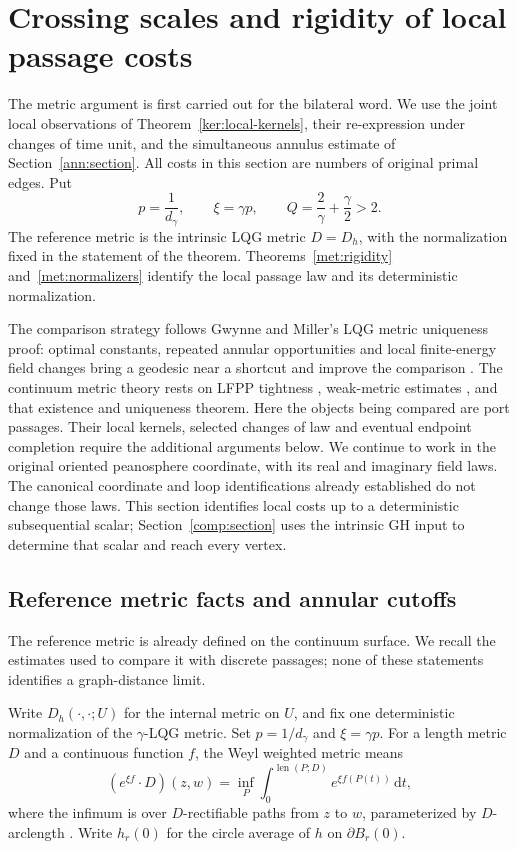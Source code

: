 \documentclass[11pt]{article}
\numberwithin{equation}{section}
\theoremstyle{definition}
\theoremstyle{remark}
\newcommand{\dd}{\mathrm d}
\newcommand{\1}{\mathbf 1}
\DeclareMathOperator{\len}{len}
\begin{document}
\section{Crossing scales and rigidity of local passage costs}
\label{met:section}

The metric argument is first carried out for the bilateral word.  We use
the joint local observations of Theorem~\ref{ker:local-kernels}, their
re-expression under changes of time unit, and the simultaneous annulus
estimate of Section~\ref{ann:section}.  All costs in this section are
numbers of original primal edges.  Put
\[
 p=\frac1{d_\gamma},\qquad \xi=\gamma p,\qquad
 Q=\frac2\gamma+\frac\gamma2>2.
\]
The reference metric is the intrinsic LQG metric $D=D_h$, with the
normalization fixed in the statement of the theorem.
Theorems~\ref{met:rigidity} and~\ref{met:normalizers} identify the local
passage law and its deterministic normalization.

The comparison strategy follows Gwynne and Miller's LQG metric uniqueness
proof: optimal constants, repeated annular opportunities and local
finite-energy field changes bring a geodesic near a shortcut and improve
the comparison
\cite[Section~1.5 and Sections~3--6]{GwynneMillerMetric}. The continuum
metric theory rests on LFPP tightness
\cite{DingDubedatDunlapFalconetTightness}, weak-metric estimates
\cite{DubedatEtAlWeakMetric}, and that existence and uniqueness theorem.
Here the objects being compared are port passages. Their local kernels,
selected changes of law and eventual endpoint completion require the
additional arguments below.  We continue to work in the original
oriented peanosphere coordinate, with its real and imaginary field
laws.  The canonical coordinate and loop identifications already
established do not change those laws.  This section identifies local
costs up to a deterministic subsequential scalar; Section~\ref{comp:section}
uses the intrinsic GH input to determine that scalar and reach every
vertex.

\subsection{Reference metric facts and annular cutoffs}

The reference metric is already defined on the continuum surface.  We
recall the estimates used to compare it with discrete passages; none
of these statements identifies a graph-distance limit.


Write $D_h(\cdot,\cdot;U)$ for the internal metric on $U$, and fix one
deterministic normalization of the $\gamma$-LQG metric.  Set
$p=1/d_\gamma$ and $\xi=\gamma p$. For a length metric $D$ and a
continuous function $f$, the Weyl weighted metric means
\[
 (e^{\xi f}\!\cdot D)(z,w)
 =\inf_P\int_0^{\len(P;D)}e^{\xi f(P(t))}\,\dd t,
\]
where the infimum is over $D$-rectifiable paths from $z$ to $w$,
parameterized by $D$-arclength \citep{GwynneMillerMetric}.
Write $h_r(0)$ for the circle average of $h$ on $\partial B_r(0)$.
\end{document}
